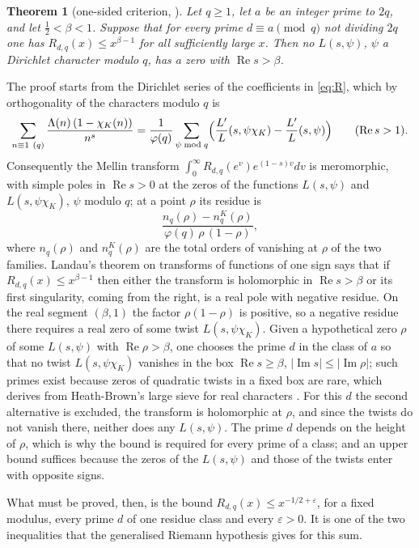 \documentclass[10pt]{amsart}
\newtheorem{theorem}{Theorem}[section]
\theoremstyle{definition}
\theoremstyle{remark}
\newcommand{\Rel}{\operatorname{Re}}
\newcommand{\Iml}{\operatorname{Im}}
\begin{document}
\begin{theorem}[one-sided criterion, {\cite{P46}}]\label{thm:criterion}
Let $q\ge1$, let $a$ be an integer prime to $2q$, and let $\tfrac12<\beta<1$. Suppose that for
every prime $d\equiv a\pmod q$ not dividing $2q$ one has $R_{d,q}(x)\le x^{\beta-1}$ for all
sufficiently large $x$. Then no $L(s,\psi)$, $\psi$ a Dirichlet character modulo $q$, has a zero
with $\Rel s>\beta$.
\end{theorem}
The proof starts from the Dirichlet series of the coefficients in \eqref{eq:R}, which by
orthogonality of the characters modulo $q$ is
\[
 \sum_{n\equiv1\ (q)}\frac{\Lambda(n)\,(1-\chi_K(n))}{n^{s}}
 =\frac1{\varphi(q)}\sum_{\psi\bmod q}\Bigl(\frac{L'}{L}(s,\psi\chi_K)-\frac{L'}{L}(s,\psi)\Bigr)\qquad(\Rel s>1).
\]
Consequently the Mellin transform $\int_0^\infty R_{d,q}(e^v)e^{(1-s)v}dv$ is meromorphic, with
simple poles in $\Rel s>0$ at the zeros of the
functions $L(s,\psi)$ and $L(s,\psi\chi_K)$, $\psi$ modulo $q$; at a point $\rho$ its residue is
\[
 \frac{n_q(\rho)-n_q^K(\rho)}{\varphi(q)\,\rho\,(1-\rho)} ,
\]
where $n_q(\rho)$ and $n_q^K(\rho)$ are the total orders of vanishing at $\rho$ of the two
families. Landau's theorem on transforms of functions of one sign \cite[\S15.1, Lemma~15.1]{MV} says
that if $R_{d,q}(x)\le x^{\beta-1}$ then either the transform is holomorphic in $\Rel s>\beta$
or its first singularity, coming from the right, is a real pole with negative residue. On the
real segment $(\beta,1)$ the factor $\rho(1-\rho)$ is positive, so a negative residue there
requires a real zero of some twist $L(s,\psi\chi_K)$. Given a hypothetical zero $\rho$ of some
$L(s,\psi)$ with $\Rel\rho>\beta$, one chooses the prime $d$ in the class of $a$ so that no
twist $L(s,\psi\chi_K)$ vanishes in the box $\Rel s\ge\beta$, $|\Iml s|\le|\Iml\rho|$; such
primes exist because zeros of quadratic twists in a fixed box are rare, which \cite{P46}
derives from Heath-Brown's large sieve for real characters \cite{HeathBrown1995}. For this $d$
the second alternative is excluded, the transform is holomorphic at $\rho$, and since the
twists do not vanish there, neither does any $L(s,\psi)$. The prime $d$ depends on the height
of $\rho$, which is why the bound is required for every prime of a class; and an upper bound
suffices because the zeros of the $L(s,\psi)$ and those of the twists enter with opposite
signs.

What must be proved, then, is the bound $R_{d,q}(x)\le x^{-1/2+\varepsilon}$, for a fixed
modulus, every prime $d$ of one residue class and every $\varepsilon>0$. It is one of the two
inequalities that the generalised Riemann hypothesis gives for this sum.
\end{document}
